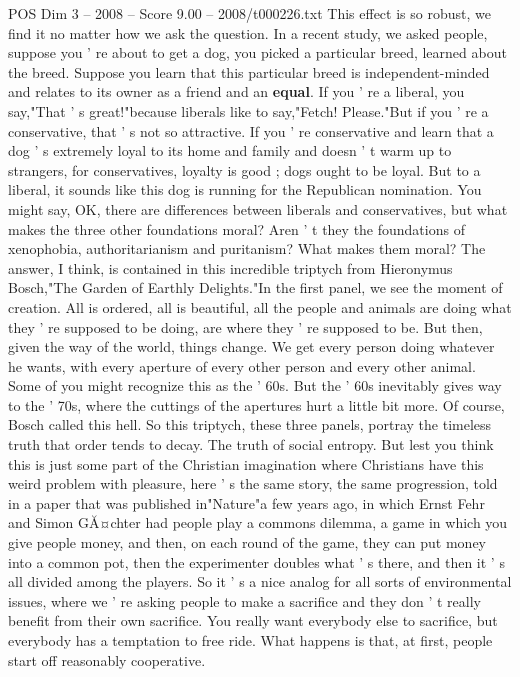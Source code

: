 \begin{textsample}{POS Dim 3 – 2008 – Score 9.00 – 2008/t000226.txt}
This effect is so robust, we find it no matter how we ask the question.
In a recent study, we asked people, suppose you ' re about to get a dog, you picked a particular breed, learned about the breed.
Suppose you learn that this particular breed is independent-minded and relates to its owner as a friend and an \textbf{equal}.
If you ' re a liberal, you say,"That ' s great!"because liberals like to say,"Fetch!
Please."But if you ' re a conservative, that ' s not so attractive.
If you ' re conservative and learn that a dog ' s extremely loyal to its home and family and doesn ' t warm up to strangers, for conservatives, loyalty is good ; dogs ought to be loyal.
But to a liberal, it sounds like this dog is running for the Republican nomination.
You might say, OK, there are differences between liberals and conservatives, but what makes the three other foundations moral?
Aren ' t they the foundations of xenophobia, authoritarianism and puritanism?
What makes them moral?
The answer, I think, is contained in this incredible triptych from Hieronymus Bosch,"The Garden of Earthly Delights."In the first panel, we see the moment of creation.
All is ordered, all is beautiful, all the people and animals are doing what they ' re supposed to be doing, are where they ' re supposed to be.
But then, given the way of the world, things change.
We get every person doing whatever he wants, with every aperture of every other person and every other animal.
Some of you might recognize this as the ' 60s.
But the ' 60s inevitably gives way to the ' 70s, where the cuttings of the apertures hurt a little bit more.
Of course, Bosch called this hell.
So this triptych, these three panels, portray the timeless truth that order tends to decay.
The truth of social entropy.
But lest you think this is just some part of the Christian imagination where Christians have this weird problem with pleasure, here ' s the same story, the same progression, told in a paper that was published in"Nature"a few years ago, in which Ernst Fehr and Simon GĂ¤chter had people play a commons dilemma, a game in which you give people money, and then, on each round of the game, they can put money into a common pot, then the experimenter doubles what ' s there, and then it ' s all divided among the players.
So it ' s a nice analog for all sorts of environmental issues, where we ' re asking people to make a sacrifice and they don ' t really benefit from their own sacrifice.
You really want everybody else to sacrifice, but everybody has a temptation to free ride.
What happens is that, at first, people start off reasonably cooperative.

\end{textsample}
